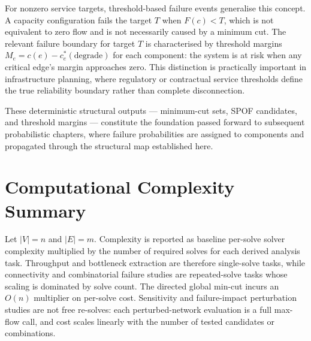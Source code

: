 \documentclass[12pt]{report}
\begin{document}
For nonzero service targets, threshold-based failure events generalise this concept. A capacity configuration fails the target $T$ when $F(c) < T$, which is not equivalent to zero flow and is not necessarily caused by a minimum cut. The relevant failure boundary for target $T$ is characterised by threshold margins $M_e = c(e) - c_e^*(\mathrm{degrade})$ for each component: the system is at risk when any critical edge's margin approaches zero. This distinction is practically important in infrastructure planning, where regulatory or contractual service thresholds define the true reliability boundary rather than complete disconnection.

These deterministic structural outputs — minimum-cut sets, SPOF candidates, and threshold margins — constitute the foundation passed forward to subsequent probabilistic chapters, where failure probabilities are assigned to components and propagated through the structural map established here.

\section{Computational Complexity Summary}

Let $|V|=n$ and $|E|=m$. Complexity is reported as baseline per-solve solver complexity multiplied by the number of required solves for each derived analysis task. Throughput and bottleneck extraction are therefore single-solve tasks, while connectivity and combinatorial failure studies are repeated-solve tasks whose scaling is dominated by solve count. The directed global min-cut incurs an $O(n)$ multiplier on per-solve cost. Sensitivity and failure-impact perturbation studies are not free re-solves: each perturbed-network evaluation is a full max-flow call, and cost scales linearly with the number of tested candidates or combinations.
\end{document}
